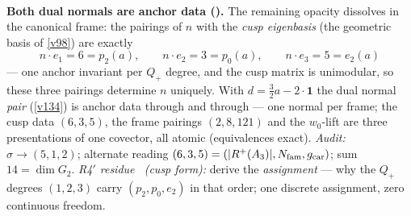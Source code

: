 \begin{keybox}
\smallskip\\
\noindent\textbf{Both dual normals are anchor data ().} The remaining
opacity dissolves in the canonical frame: the pairings of $n$ with the \emph{cusp eigenbasis} (the
geometric basis of \vref{v98}) are exactly
\[
  \boxed{\ n\cdot e_1=6=p_2(a),\qquad n\cdot e_2=3=p_0(a),\qquad n\cdot e_3=5=e_2(a)\ }
\]
--- one anchor invariant per $Q_+$ degree, and the cusp matrix is unimodular, so these three pairings
determine $n$ uniquely. With $d=\tfrac32a-2\cdot\mathbf1$ the dual normal \emph{pair} (\vref{v134}) is
anchor data through and through --- one normal per frame; the cusp data $(6,3,5)$, the frame pairings
$(2,8,121)$ and the $w_0$-lift are three presentations of one covector, all atomic (equivalences exact).
\emph{Audit:} $\sigma\to(5,1,2)$; alternate reading $(6,3,5)=(|R^+(A_3)|,N_{\mathrm{fam}},g_{\mathrm{car}})$; sum
$14=\dim G_2$. \emph{R4$'$ residue \mC\ (cusp form):} derive the \emph{assignment} --- why the $Q_+$
degrees $(1,2,3)$ carry $(p_2,p_0,e_2)$ in that order; one discrete assignment, zero continuous freedom.
\end{keybox}

